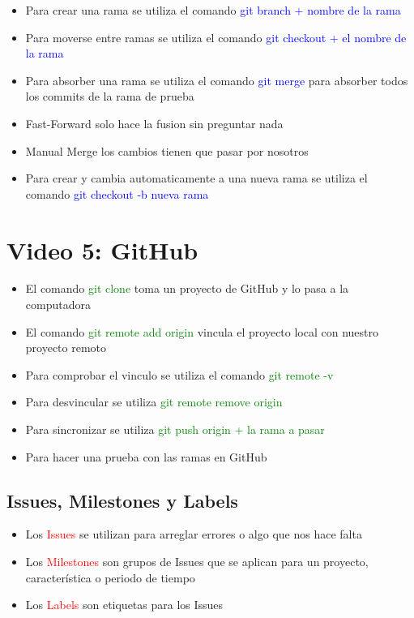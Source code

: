 \documentclass{article}
\begin{document}
	\begin{itemize}
	\item Para crear una rama se utiliza el comando \textcolor{blue}{git branch $+$ nombre de la rama}
	\item Para moverse entre ramas se utiliza el comando \textcolor{blue}{git checkout + el nombre de la rama}
	\item Para absorber una rama se utiliza el comando \textcolor{blue}{git merge} para absorber todos los commits de la rama de prueba
	\item Fast-Forward solo hace la fusion sin preguntar nada
	\item Manual Merge los cambios tienen que pasar por nosotros
	\item Para crear y cambia automaticamente a una nueva rama se utiliza el comando \textcolor{blue}{git checkout -b nueva rama}
	\end{itemize}

	\section{Video 5: GitHub}
	
	\begin{itemize}
		
	\item El comando \textcolor{green}{git clone} toma un proyecto de GitHub y lo pasa a la computadora
	\item El comando \textcolor{green}{git remote add origin} vincula el proyecto local con nuestro proyecto remoto
	\item Para comprobar el vinculo se utiliza el comando \textcolor{green}{git remote -v}
	\item Para desvincular se utiliza \textcolor{green}{git remote remove origin}
	\item Para sincronizar se utiliza \textcolor{green}{git push origin + la rama a pasar}
	\item Para hacer una prueba con las ramas en GitHub
	\end{itemize}
	
	\subsection{Issues, Milestones y Labels}
	
	\begin{itemize}
		\item Los \textcolor{red}{Issues} se utilizan para arreglar errores o algo que nos hace falta
		\item Los \textcolor{red}{Milestones} son grupos de Issues que se aplican para un proyecto, característica o periodo de tiempo
		\item Los \textcolor{red}{Labels} son etiquetas para los Issues
	\end{itemize}
\end{document}
